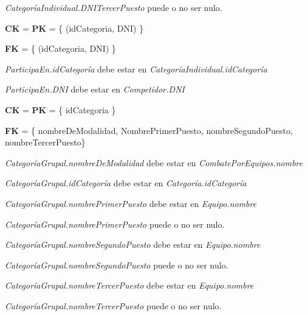 \textit{CategoríaIndividual.DNITercerPuesto} puede o no ser nulo. \\


\textbf{CK} = \textbf{PK} = \{ (idCategoria, DNI) \}

\textbf{FK} = \{ (idCategoria, DNI) \}

\textit{ParticipaEn.idCategoría} debe estar en \textit{CategoríaIndividual.idCategoría}

\textit{ParticipaEn.DNI} debe estar en \textit{Competidor.DNI}\\


\textbf{CK} = \textbf{PK} = \{ idCategoria \}

\textbf{FK} = \{ nombreDeModalidad,  NombrePrimerPuesto, nombreSegundoPuesto, nombreTercerPuesto\}

\textit{CategoríaGrupal.nombreDeModalidad} debe estar en \textit{CombatePorEquipos.nombre}

\textit{CategoríaGrupal.idCategoría} debe estar en \textit{Categoría.idCategoría}

\textit{CategoríaGrupal.nombrePrimerPuesto} debe estar en \textit{Equipo.nombre}

\textit{CategoríaGrupal.nombrePrimerPuesto} puede o no ser nulo.

\textit{CategoríaGrupal.nombreSegundoPuesto} debe estar en \textit{Equipo.nombre}

\textit{CategoríaGrupal.nombreSegundoPuesto} puede o no ser nulo.

\textit{CategoríaGrupal.nombreTercerPuesto} debe estar en \textit{Equipo.nombre}

\textit{CategoríaGrupal.nombreTercerPuesto} puede o no ser nulo.\\
